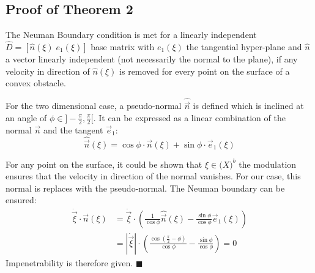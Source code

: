 \subsection{Proof of Theorem 2} \label{sec:proof2}
The Neuman Boundary condition is met for a linearly independent $\hat{D} = [\hat n (\xi) \; e_1(\xi) ]$ base matrix with $e_1(\xi) $ the tangential hyper-plane and $\hat n$ a vector linearly independent (not necessarily the normal to the plane), if any velocity in direction of $\hat n(\xi)$ is removed for every point on the surface of a convex obstacle.

For the two dimensional case, a pseudo-normal $\hat{ \vec n}$ is defined which is inclined at an angle of $\phi \in ]-\frac{\pi}{2}, \frac{\pi}{2}[$. It can be expressed as a linear combination of the normal $\vec n$ and the tangent $\vec e_1$:
\begin{equation}
\hat{ \vec n} (\xi) = \cos \phi \cdot \vec n (\xi) + \sin \phi \cdot \vec e_1 (\xi)
\end{equation}

For any point on the surface, it could be shown that $\xi \in \mathcal(X)^b$ the modulation ensures that the velocity in direction of the normal vanishes. For our case, this normal is replaces with the pseudo-normal. The Neuman boundary can be ensured:
\begin{align}
  \dot{\vec \xi} \cdot \vec n (\xi) &=  \dot{\vec \xi} \cdot \left(\frac{1}{\cos \phi} \hat{\vec n}(\xi) - \frac{\sin \phi}{\cos \phi} \vec{e}_1 (\xi) \right) \\
  & = \left| \dot{\vec \xi}  \right| \cdot \left(\frac{\cos(\frac{\pi}{2}-\phi)}{\cos \phi} - \frac{\sin \phi}{\cos \phi}\right) = 0
\end{align}
Impenetrability is therefore given. \hfill $\blacksquare$



